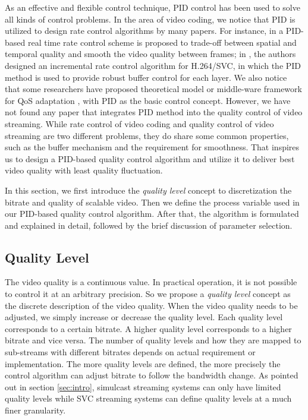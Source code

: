 \documentclass[journal]{IEEEtran}
\begin{document}
As an effective and flexible control technique, PID control has been used to solve all kinds of control problems. In the area of video coding, we notice that PID is utilized to design rate control algorithms by many papers. For instance, in \cite{Wong04} a PID-based real time rate control scheme is proposed to trade-off between spatial and temporal quality and smooth the video quality between frames; in \cite{Yang10}, the authors designed an incremental rate control algorithm for H.264/SVC, in which the PID method is used to provide robust buffer control for each layer. We also notice that some researchers have proposed theoretical model or middle-ware framework for QoS adaptation \cite{Li98}\cite{Li99}, with PID as the basic control concept. However, we have not found any paper that integrates PID method into the quality control of video streaming. While rate control of video coding and quality control of video streaming are two different problems, they do share some common properties, such as the buffer mechanism and the requirement for smoothness. That inspires us to design a PID-based quality control algorithm and utilize it to deliver best video quality with least quality fluctuation.

In this section, we first introduce the \textit{quality level} concept to discretization the bitrate and quality of scalable video. Then we define the process variable used in our PID-based quality control algorithm. After that, the algorithm is formulated and explained in detail, followed by the brief discussion of parameter selection.

\subsection{Quality Level}
\label{subsec:quality-level}

The video quality is a continuous value. In practical operation, it is not possible to control it at an arbitrary precision. So we propose a \textit{quality level} concept as the discrete description of the video quality. When the video quality needs to be adjusted, we simply increase or decrease the quality level. Each quality level corresponds to a certain bitrate. A higher quality level corresponds to a higher bitrate and vice versa. The number of quality levels and how they are mapped to sub-streams with different bitrates depends on actual requirement or implementation. The more quality levels are defined, the more precisely the control algorithm can adjust bitrate to follow the bandwidth change. As pointed out in section \ref{sec:intro}, simulcast streaming systems can only have limited quality levels while SVC streaming systems can define quality levels at a much finer granularity.
\end{document}
